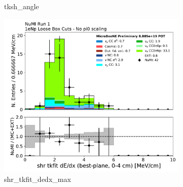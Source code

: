 \begin{figure}[H]
\begin{subfigure}{0.3\textwidth}
    \caption{tksh\_angle}
    \end{subfigure}
    \begin{subfigure}{0.3\textwidth}
    \includegraphics[width=1.0\textwidth]{Sidebands/Figures/NuMI/1eNp/shr_tkfit_dedx_max.pdf}
    \caption{shr\_tkfit\_dedx\_max}
    \end{subfigure}
    \caption{} 
    \label{fig:NuMI_1eNp_1}
\end{figure}

